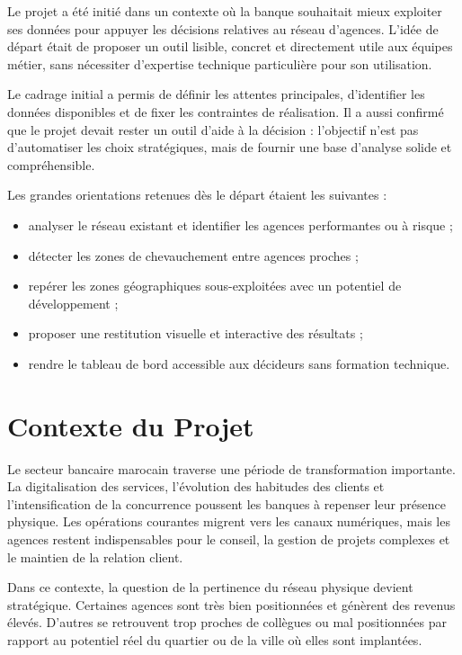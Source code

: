 \documentclass[11pt,a4paper,twoside]{report}
\begin{document}
Le projet a été initié dans un contexte où la banque souhaitait mieux exploiter ses données pour appuyer les décisions relatives au réseau d'agences. L'idée de départ était de proposer un outil lisible, concret et directement utile aux équipes métier, sans nécessiter d'expertise technique particulière pour son utilisation.

Le cadrage initial a permis de définir les attentes principales, d'identifier les données disponibles et de fixer les contraintes de réalisation. Il a aussi confirmé que le projet devait rester un outil d'aide à la décision : l'objectif n'est pas d'automatiser les choix stratégiques, mais de fournir une base d'analyse solide et compréhensible.

Les grandes orientations retenues dès le départ étaient les suivantes :
\begin{itemize}[leftmargin=1.2cm]
    \item analyser le réseau existant et identifier les agences performantes ou à risque ;
    \item détecter les zones de chevauchement entre agences proches ;
    \item repérer les zones géographiques sous-exploitées avec un potentiel de développement ;
    \item proposer une restitution visuelle et interactive des résultats ;
    \item rendre le tableau de bord accessible aux décideurs sans formation technique.
\end{itemize}

\section{Contexte du Projet}

Le secteur bancaire marocain traverse une période de transformation importante. La digitalisation des services, l'évolution des habitudes des clients et l'intensification de la concurrence poussent les banques à repenser leur présence physique. Les opérations courantes migrent vers les canaux numériques, mais les agences restent indispensables pour le conseil, la gestion de projets complexes et le maintien de la relation client.

Dans ce contexte, la question de la pertinence du réseau physique devient stratégique. Certaines agences sont très bien positionnées et génèrent des revenus élevés. D'autres se retrouvent trop proches de collègues ou mal positionnées par rapport au potentiel réel du quartier ou de la ville où elles sont implantées.
\end{document}
